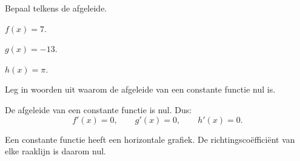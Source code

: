 \documentclass{ximera}
\begin{document}
\begin{oefening}{\oefB\ESS}

Bepaal telkens de afgeleide.

\begin{question}

\(
f(x)=7.
\)

\end{question}

\begin{question}

\(
g(x)=-13.
\)

\end{question}

\begin{question}

\(
h(x)=\pi.
\)

\end{question}

\begin{question}
Leg in woorden uit waarom de afgeleide van een constante functie
nul is.
\end{question}

\begin{oplossing}

De afgeleide van een constante functie is nul. Dus:
\[
f'(x)=0,
\qquad
g'(x)=0,
\qquad
h'(x)=0.
\]

Een constante functie heeft een horizontale grafiek. De richtingscoëfficiënt
van elke raaklijn is daarom nul.

\end{oplossing}

\end{oefening}


\end{document}
